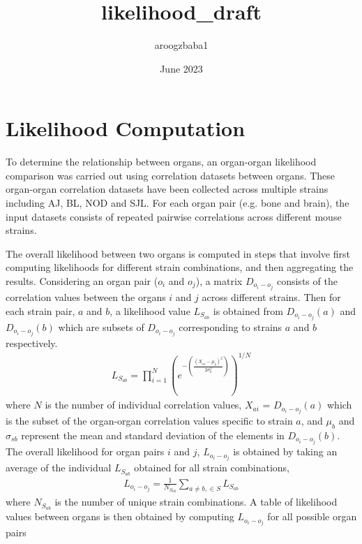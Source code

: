 \documentclass{article}
\title{likelihood_draft}
\author{aroogzbaba1 }
\date{June 2023}
\begin{document}

\section{Likelihood Computation}

To determine the relationship between organs, an organ-organ likelihood comparison was carried out using correlation datasets between organs.
These organ-organ correlation datasets have been collected across multiple strains including AJ, BL, NOD and SJL.
For each organ pair (e.g. bone and brain),  the input datasets consists of repeated pairwise correlations across different mouse strains.

The overall likelihood between two organs is computed in steps that involve first computing likelihoods for different strain combinations, and then aggregating the results. %
Considering an organ pair ($o_i$ and $o_j$), a matrix $D_{o_i-o_j}$  consists of the correlation values between the organs $i$ and $j$ across different strains. Then for each strain pair, $a$ and $b$, a likelihood value $L_{S_{ab}}$ is obtained from $D_{o_i-o_j}(a)$  and $D_{o_i-o_j}(b)$  which are subsets of $D_{o_i-o_j}$ corresponding to strains $a$ and $b$ respectively.
  \begin{align}
      L_{S_{ab}}  = \prod_{i=1}^N (e^{-(\frac{(X_{ai} - \mu_{b})^2}{2\sigma_{b}^2})})^{1/N}
  \end{align}
where $N$ is the number of individual correlation values, $X_{ai}$ = $D_{o_i-o_j}(a)$ which is the subset of the organ-organ correlation values specific to strain $a$, and $\mu_{b}$ and $\sigma_{sb}$ represent the mean and standard deviation of the elements in $D_{o_i-o_j}(b)$. The overall likelihood for organ pairs $i$ and $j$, $L_{o_i-o_j}$ is obtained by taking an average of the individual $L_{S_{ab}}$ obtained for all strain combinations,
\begin{align}
    L_{o_i-o_j} = \frac{1}{N_{S_{ab}}} \sum_{a \ne b, \in S} L_{S_{ab}}
\end{align}
where $N_{S_{ab}}$ is the number of unique strain combinations.
A table of likelihood values between organs is then obtained by computing $L_{o_i-o_j}$ for all possible organ pairs
\end{document}
